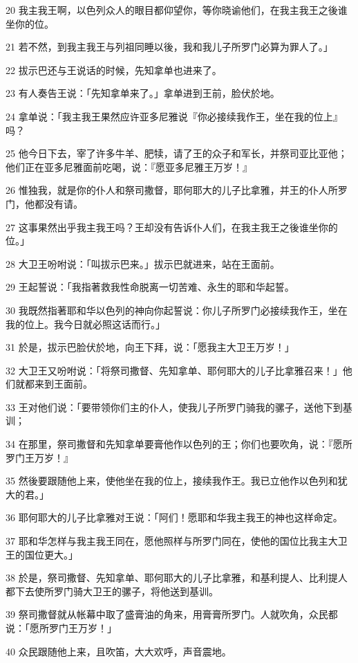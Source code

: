 \par 20 我主我王啊，以色列众人的眼目都仰望你，等你晓谕他们，在我主我王之後谁坐你的位。
\par 21 若不然，到我主我王与列祖同睡以後，我和我儿子所罗门必算为罪人了。」
\par 22 拔示巴还与王说话的时候，先知拿单也进来了。
\par 23 有人奏告王说：「先知拿单来了。」拿单进到王前，脸伏於地。
\par 24 拿单说：「我主我王果然应许亚多尼雅说『你必接续我作王，坐在我的位上』吗？
\par 25 他今日下去，宰了许多牛羊、肥犊，请了王的众子和军长，并祭司亚比亚他；他们正在亚多尼雅面前吃喝，说：『愿亚多尼雅王万岁！』
\par 26 惟独我，就是你的仆人和祭司撒督，耶何耶大的儿子比拿雅，并王的仆人所罗门，他都没有请。
\par 27 这事果然出乎我主我王吗？王却没有告诉仆人们，在我主我王之後谁坐你的位。」
\par 28 大卫王吩咐说：「叫拔示巴来。」拔示巴就进来，站在王面前。
\par 29 王起誓说：「我指著救我性命脱离一切苦难、永生的耶和华起誓。
\par 30 我既然指著耶和华以色列的神向你起誓说：你儿子所罗门必接续我作王，坐在我的位上。我今日就必照这话而行。」
\par 31 於是，拔示巴脸伏於地，向王下拜，说：「愿我主大卫王万岁！」
\par 32 大卫王又吩咐说：「将祭司撒督、先知拿单、耶何耶大的儿子比拿雅召来！」他们就都来到王面前。
\par 33 王对他们说：「要带领你们主的仆人，使我儿子所罗门骑我的骡子，送他下到基训；
\par 34 在那里，祭司撒督和先知拿单要膏他作以色列的王；你们也要吹角，说：『愿所罗门王万岁！』
\par 35 然後要跟随他上来，使他坐在我的位上，接续我作王。我已立他作以色列和犹大的君。」
\par 36 耶何耶大的儿子比拿雅对王说：「阿们！愿耶和华我主我王的神也这样命定。
\par 37 耶和华怎样与我主我王同在，愿他照样与所罗门同在，使他的国位比我主大卫王的国位更大。」
\par 38 於是，祭司撒督、先知拿单、耶何耶大的儿子比拿雅，和基利提人、比利提人都下去使所罗门骑大卫王的骡子，将他送到基训。
\par 39 祭司撒督就从帐幕中取了盛膏油的角来，用膏膏所罗门。人就吹角，众民都说：「愿所罗门王万岁！」
\par 40 众民跟随他上来，且吹笛，大大欢呼，声音震地。
